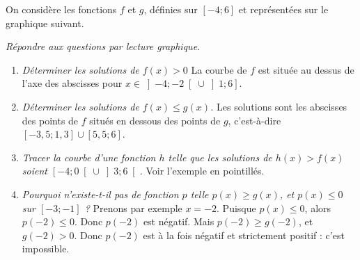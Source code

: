 \documentclass[12pt]{article}
\begin{document}
\begin{exercice}
  On considère les fonctions $f$ et $g$, définies sur $\left[ -4;6 \right]$ et
  représentées sur le graphique suivant.
  \begin{center}
  \end{center}
  \emph{Répondre aux questions par lecture graphique.}
  \begin{enumerate}
  \item \emph{Déterminer les solutions de $f(x)>0$} La courbe de $f$ est située au dessus de l'axe des abscisses pour $x\in\left] -4;-2 \right[\cup \left] 1;6 \right]$.
    \item \emph{Déterminer les solutions de $f(x)\leq g(x)$.} Les solutions sont les abscisses des points de $f$ situés en dessous des points de $g$, c'est-à-dire $\left[-3,5;1,3 \right]\cup\left[5,5;6 \right]$.
    \item \emph{Tracer la courbe d'une fonction $h$ telle que les solutions de $h(x)>f(x)$ soient $\left[ -4;0 \right[ \cup \left] 3;6 \right[$.} Voir l'exemple en pointillés.
      \item \emph{Pourquoi n'existe-t-il pas de fonction $p$ telle $p(x) \geq g(x)$, et $p(x)\leq0$ sur $\left[ -3;-1 \right]$ ?} Prenons par exemple $x=-2$. Puisque $p(x)\leq0$, alors $p(-2)\leq0$. Donc $p(-2)$ est négatif. Mais $p(-2)\geq g(-2)$, et $g(-2)>0$. Donc $p(-2)$ est à la fois négatif et strictement positif : c'est impossible.
  \end{enumerate}

\end{exercice}
\end{document}
